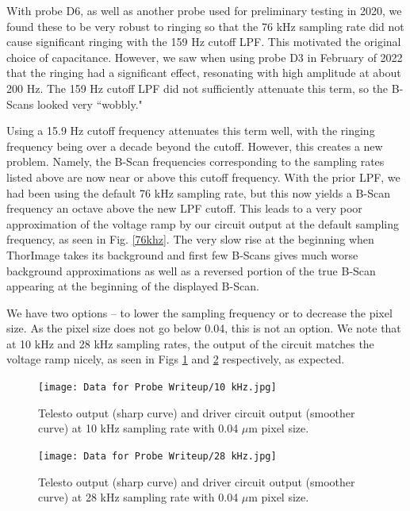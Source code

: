 \documentclass{article}
\begin{document}
\par{With probe D6, as well as another probe used for preliminary testing in 2020, we found these to be very robust to ringing so that the 76 kHz sampling rate did not cause significant ringing with the 159 Hz cutoff LPF. This motivated the original choice of capacitance. However, we saw when using probe D3 in February of 2022 that the ringing had a significant effect, resonating with high amplitude at about 200 Hz. The 159 Hz cutoff LPF did not sufficiently attenuate this term, so the B-Scans looked very ``wobbly."}
\par{Using a 15.9 Hz cutoff frequency attenuates this term well, with the ringing frequency being over a decade beyond the cutoff. However, this creates a new problem. Namely, the B-Scan frequencies corresponding to the sampling rates listed above are now near or above this cutoff frequency. With the prior LPF, we had been using the default 76 kHz sampling rate, but this now yields a B-Scan frequency an octave above the new LPF cutoff. This leads to a very poor approximation of the voltage ramp by our circuit output at the default sampling frequency, as seen in Fig. \ref{76khz}. The very slow rise at the beginning when ThorImage takes its background and first few B-Scans gives much worse background approximations as well as a reversed portion of the true B-Scan appearing at the beginning of the displayed B-Scan.}

\par{We have two options -- to lower the sampling frequency or to decrease the pixel size. As the pixel size does not go below 0.04, this is not an option. We note that at 10 kHz and 28 kHz sampling rates, the output of the circuit matches the voltage ramp nicely, as seen in Figs \ref{10khz} and \ref{28khz} respectively, as expected.}

\begin{figure}[!h]
	\centering
	\texttt{[image: Data for Probe Writeup/10 kHz.jpg]}
	\caption{Telesto output (sharp curve) and driver circuit output (smoother curve) at 10 kHz sampling rate with 0.04 $\mu$m pixel size.}
\label{10khz}
\end{figure}

\begin{figure}[!h]
	\centering
	\texttt{[image: Data for Probe Writeup/28 kHz.jpg]}
	\caption{Telesto output (sharp curve) and driver circuit output (smoother curve) at 28 kHz sampling rate with 0.04 $\mu$m pixel size.}
\label{28khz}
\end{figure}
\end{document}
